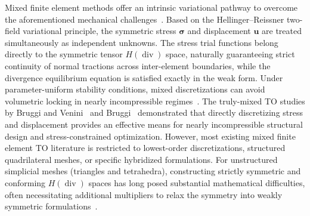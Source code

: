 Mixed finite element methods offer an intrinsic variational pathway to overcome the aforementioned mechanical challenges~\cite{BoffiBrezziFortin2013}. Based on the Hellinger--Reissner two-field variational principle, the symmetric stress $\boldsymbol{\sigma}$ and displacement $\boldsymbol{u}$ are treated simultaneously as independent unknowns. The stress trial functions belong directly to the symmetric tensor $H(\operatorname{div})$ space, naturally guaranteeing strict continuity of normal tractions across inter-element boundaries, while the divergence equilibrium equation is satisfied exactly in the weak form. Under parameter-uniform stability conditions, mixed discretizations can avoid volumetric locking in nearly incompressible regimes~\cite{BoffiBrezziFortin2013}. The truly-mixed TO studies by Bruggi and Venini~\cite{BruggiVenini2007,BruggiVenini2008} and Bruggi~\cite{Bruggi2016} demonstrated that directly discretizing stress and displacement provides an effective means for nearly incompressible structural design and stress-constrained optimization. However, most existing mixed finite element TO literature is restricted to lowest-order discretizations, structured quadrilateral meshes, or specific hybridized formulations. For unstructured simplicial meshes (triangles and tetrahedra), constructing strictly symmetric and conforming $H(\operatorname{div})$ spaces has long posed substantial mathematical difficulties, often necessitating additional multipliers to relax the symmetry into weakly symmetric formulations~\cite{ArnoldWinther2002,AdamsCockburn2005,Arnold2007}.

